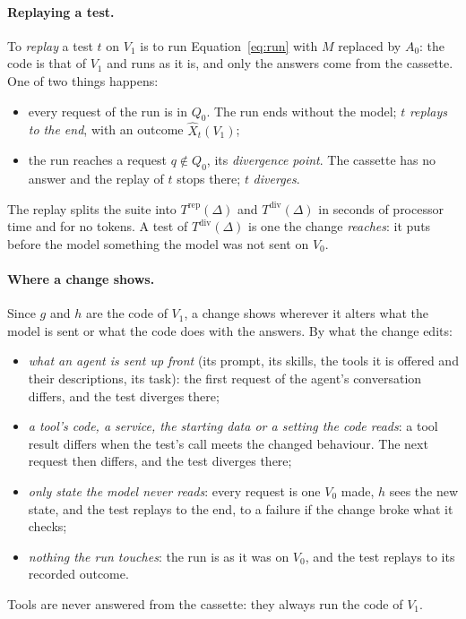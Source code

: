 \documentclass[11pt,a4paper]{article}
\begin{document}
\paragraph{Replaying a test.} To \emph{replay} a test $t$ on $V_1$ is to run Equation~\ref{eq:run} with $M$
replaced by $A_0$: the code is that of $V_1$ and runs as it is, and only the answers come from the cassette. One
of two things happens:
\begin{itemize}
  \item every request of the run is in $Q_0$. The run ends without the model; $t$ \emph{replays to the end}, with
        an outcome $\hat{X}_t(V_1)$;
  \item the run reaches a request $q \notin Q_0$, its \emph{divergence point}. The cassette has no answer and the
        replay of $t$ stops there; $t$ \emph{diverges}.
\end{itemize}
The replay splits the suite into $T^{\mathrm{rep}}(\Delta)$ and $T^{\mathrm{div}}(\Delta)$ in seconds of processor
time and for no tokens. A test of $T^{\mathrm{div}}(\Delta)$ is one the change \emph{reaches}: it puts before the
model something the model was not sent on $V_0$.

\paragraph{Where a change shows.} Since $g$ and $h$ are the code of $V_1$, a change shows wherever it alters what
the model is sent or what the code does with the answers. By what the change edits:
\begin{itemize}
  \item \emph{what an agent is sent up front} (its prompt, its skills, the tools it is offered and their
        descriptions, its task): the first request of the agent's conversation differs, and the test diverges
        there;
  \item \emph{a tool's code, a service, the starting data or a setting the code reads}: a tool result differs
        when the test's call meets the changed behaviour. The next request then differs, and the test diverges
        there;
  \item \emph{only state the model never reads}: every request is one $V_0$ made, $h$ sees the new state, and the
        test replays to the end, to a failure if the change broke what it checks;
  \item \emph{nothing the run touches}: the run is as it was on $V_0$, and the test replays to its recorded
        outcome.
\end{itemize}
Tools are never answered from the cassette: they always run the code of $V_1$.
\end{document}

